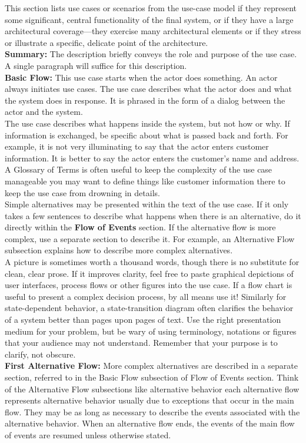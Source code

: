 \documentclass{FastFyp}
\begin{document}
This section lists use cases or scenarios from the use-case model if they represent some significant, central functionality of the final system, or if they have a large architectural coverage—they exercise many architectural elements or if they stress or illustrate a specific, delicate point of the architecture.\\
\textbf{Summary:} The description briefly conveys the role and purpose of the use case. A single paragraph will suffice for this description.\\
\textbf{Basic Flow:} This use case starts when the actor does something. An actor always initiates use cases. The use case describes what the actor does and what the system does in response. It is phrased in the form of a dialog between the actor and the system.\\
The use case describes what happens inside the system, but not how or why. If information is exchanged, be specific about what is passed back and forth. For example, it is not very illuminating to say that the actor enters customer information. It is better to say the actor enters the customer’s name and address. A Glossary of Terms is often useful to keep the complexity of the use case manageable you may want to define things like customer information there to keep the use case from drowning in details.\\
Simple alternatives may be presented within the text of the use case. If it only takes a few sentences to describe what happens when there is an alternative, do it directly within the \textbf{Flow of Events} section. If the alternative flow is more complex, use a separate section to describe it. For example, an Alternative Flow subsection explains how to describe more complex alternatives.\\
A picture is sometimes worth a thousand words, though there is no substitute for clean, clear prose. If it improves clarity, feel free to paste graphical depictions of user interfaces, process flows or other figures into the use case. If a flow chart is useful to present a complex decision process, by all means use it!  Similarly for state-dependent behavior, a state-transition diagram often clarifies the behavior of a system better than pages upon pages of text. Use the right presentation medium for your problem, but be wary of using terminology, notations or figures that your audience may not understand. Remember that your purpose is to clarify, not obscure.\\
\textbf{First Alternative Flow:} More complex alternatives are described in a separate section, referred to in the Basic Flow subsection of Flow of Events section. Think of the Alternative Flow subsections like alternative behavior each alternative flow represents alternative behavior usually due to exceptions that occur in the main flow. They may be as long as necessary to describe the events associated with the alternative behavior. When an alternative flow ends, the events of the main flow of events are resumed unless otherwise stated.\\
\end{document}
